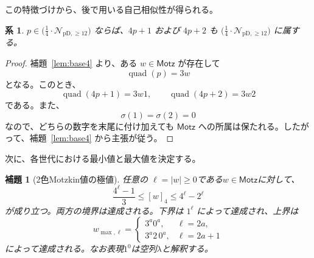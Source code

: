 \documentclass[12pt]{ltjsarticle}
\theoremstyle{plain}
\newtheorem{lemma}[theorem]{補題}
\newtheorem{corollary}[theorem]{系}
\theoremstyle{definition}
\theoremstyle{plain}
\newcommand{\Pset}{%
  \bigl(\tfrac{1}{4}\cdot\mathcal{N}_{\mathrm{pD},\geq 12}\bigr)%
}
\begin{document}
この特徴づけから、後で用いる自己相似性が得られる。

\begin{corollary}\label{cor:Pclosure}
$p\in\Pset$ ならば、$4p+1$ および $4p+2$ も $\Pset$ に属する。
\end{corollary}

\begin{proof}
補題~\ref{lem:base4} より、ある $w\in\mathsf{Motz}$ が存在して
\[
 \operatorname{quad}(p)=3w
\]
となる。このとき、
\[
 \operatorname{quad}(4p+1)=3w1,
 \qquad
 \operatorname{quad}(4p+2)=3w2
\]
である。また、
\[
 \sigma(1)=\sigma(2)=0
\]
なので、どちらの数字を末尾に付け加えても $\mathsf{Motz}$ への所属は保たれる。したがって、補題~\ref{lem:base4}
から主張が従う。
\end{proof}

次に、各世代における最小値と最大値を決定する。

\begin{lemma}[2色Motzkin値の極値]\label{lem:extremal}
任意の $\ell=|w|\geq0$である$w\in\mathsf{Motz}$に対して、
\begin{equation}\label{eq:motzkin-extrema}
  \frac{4^{\ell}-1}{3}\leq[w]_4\leq4^{\ell}-2^{\ell}
\end{equation}
が成り立つ。両方の境界は達成される。下界は $1^{\ell}$ によって達成され、上界は
\[
  w_{\max,\ell}=
  \begin{cases}
    3^a0^a,&\ell=2a,\\
    3^a2\,0^a,&\ell=2a+1
  \end{cases}
\]
によって達成される。なお表現$1^0$は空列$\lambda$と解釈する。
\end{lemma}
\end{document}
